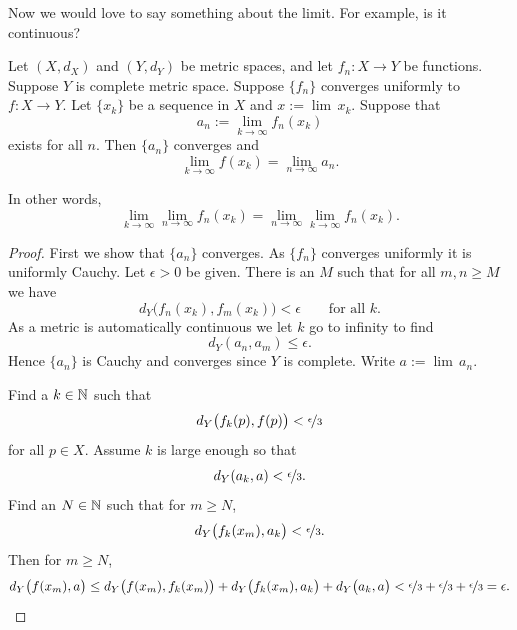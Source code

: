 Now we would love to say something about the limit.  For example, is it
continuous?


\begin{prop} \label{prop:uniformswitch}
Let $(X,d_X)$ and $(Y,d_Y)$ be metric spaces, and let
$f_n \colon X \to Y$ be functions.
Suppose $Y$ is complete metric space.
Suppose $\{ f_n \}$ converges uniformly to $f \colon X \to Y$.  
Let $\{ x_k \}$ be a sequence in $X$ and $x := \lim \, x_k$.  Suppose
that
\begin{equation*}
a_n := \lim_{k \to \infty} f_n(x_k)
\end{equation*}
exists for all $n$.  Then
$\{a_n\}$ converges and 
\begin{equation*}
\lim_{k \to \infty} f(x_k) = \lim_{n\to\infty} a_n .
\end{equation*}
\end{prop}

In other words,
\begin{equation*}
\lim_{k \to \infty} \lim_{n\to\infty} f_n(x_k) =
\lim_{n \to \infty} \lim_{k\to\infty} f_n(x_k) .
\end{equation*}

\begin{proof}
First we show that $\{ a_n \}$ converges.  As
$\{ f_n \}$ converges uniformly it is uniformly Cauchy. 
Let $\epsilon > 0$ be given.  There is
an $M$ such that for all $m,n \geq M$ we have
\begin{equation*}
d_Y\bigl(f_n(x_k),f_m(x_k)\bigr) < \epsilon \qquad \text{for all } k .
\end{equation*}
As a metric is automatically continuous we let $k$ go to infinity
to find
\begin{equation*}
d_Y(a_n,a_m) \leq \epsilon .
\end{equation*}
Hence $\{a_n\}$ is Cauchy and converges since $Y$ is complete.  Write
$a := \lim \, a_n$.

Find a $k \in {\mathbb{N}}$ such that
\begin{equation*}
d_Y\bigl(f_k(p),f(p)\bigr) < \nicefrac{\epsilon}{3}
\end{equation*}
for all $p \in X$.  Assume $k$ is large enough
so that
\begin{equation*}
d_Y(a_k,a) < \nicefrac{\epsilon}{3}  .
\end{equation*}
Find an $N \in {\mathbb{N}}$ such that for $m \geq N$,
\begin{equation*}
d_Y\bigl(f_k(x_m),a_k\bigr) < \nicefrac{\epsilon}{3}  .
\end{equation*}
Then for
$m \geq N$,
\begin{equation*}
d_Y\bigl(f(x_m),a\bigr)
\leq
d_Y\bigl(f(x_m),f_k(x_m)\bigr)
+
d_Y\bigl(f_k(x_m),a_k\bigr)
+
d_Y\bigl(a_k,a\bigr)
<
\nicefrac{\epsilon}{3} +
\nicefrac{\epsilon}{3} +
\nicefrac{\epsilon}{3} = \epsilon . \qedhere
\end{equation*}
\end{proof}

